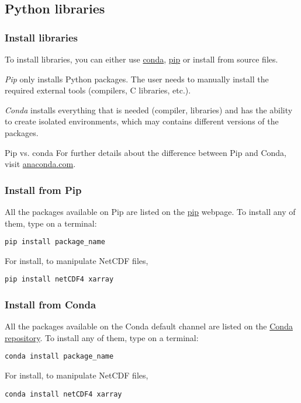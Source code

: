 \subsection{Python libraries}

\begin{frame}[fragile]
\frametitle{Install libraries}
To install libraries, you can either use \href{https://docs.conda.io/en/latest/}{conda}, \href{https://pip.pypa.io/en/stable/}{pip} or install from source files.
\vspace{1em}

\emph{Pip} only installs Python packages. The user needs to manually install the required external tools (compilers, C libraries, etc.).\\
\vspace{1em}

\emph{Conda} installs everything that is needed (compiler, libraries) and has the ability to create isolated environments, which may contains different versions of the packages.
\vspace{1em}

\begin{block}{Pip vs. conda}
For further details about the difference between Pip and Conda, visit \href{https://www.anaconda.com/understanding-conda-and-pip/}{anaconda.com}.
\end{block}
\end{frame}

\begin{frame}[fragile]
\frametitle{Install from Pip}
All the packages available on Pip are listed on the \href{https://pypi.org/}{pip} webpage. To install any of them, type on a terminal:
\begin{lstlisting}[basicstyle=\scriptsize]
pip install package_name
\end{lstlisting}
\vspace{1em}

For install, to manipulate NetCDF files, 
\begin{lstlisting}[basicstyle=\scriptsize]
pip install netCDF4 xarray
\end{lstlisting}

\end{frame}

\begin{frame}[fragile]
\frametitle{Install from Conda}
All the packages available on the Conda default channel are listed on the \href{https://repo.anaconda.com/pkgs/}{Conda repository}. To install any of them, type on a terminal:
\begin{lstlisting}[basicstyle=\ttfamily\scriptsize]
conda install package_name
\end{lstlisting}
\vspace{1em}

For install, to manipulate NetCDF files, 
\begin{lstlisting}[basicstyle=\ttfamily\scriptsize]
conda install netCDF4 xarray
\end{lstlisting}
\end{frame}

